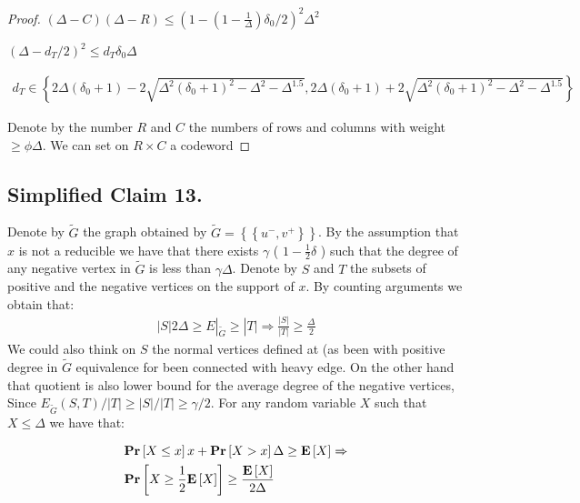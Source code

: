\begin{proof}
$\left( \Delta - C \right)\left( \Delta - R  \right) \le \left(1 - \left( 1 - \frac{1}{\Delta} \right)\delta_{0}/2  \right)^{2}\Delta^{2}$ 

$ \left( \Delta -d_{T}/2  \right)^{2} \le d_{T}\delta_{0}\Delta $


\begin{equation*}
  \begin{split}
    d_{T} \in  \left\{2 \Delta \left(\delta_{0} + 1\right) - 2 \sqrt{\Delta^{2} \left(\delta_{0} + 1\right)^{2} - \Delta^{2} - \Delta^{1.5}}, 2 \Delta \left(\delta_{0} + 1\right) + 2 \sqrt{\Delta^{2} \left(\delta_{0} + 1\right)^{2} - \Delta^{2} - \Delta^{1.5}}\right\}
  \end{split}
\end{equation*}


Denote by the number $R $ and $C$ the numbers of rows and columns with weight $\ge \phi \Delta$. We can set on $R\times C$ a codeword  
                        
                        
\end{proof}             

\subsection{Simplified Claim 13.} 
\newcommand{\Gtt}{\tilde{G}}
Denote by $\Gtt$ the graph obtained by $\Gtt  = \left\{ \left\{ u^{-}, v^{+} \right\}  \right\} $. By the assumption that $x$ is not a reducible we have that there exists $\gamma$ ( $ 1- \frac{1}{2}\delta$  )  such that the degree of any negative vertex in $\Gtt$ is less than $\gamma\Delta$. Denote by $S$ and $T$ the subsets of positive and the negative vertices on the support of $x$. By counting arguments we obtain that: 
\begin{equation*}
  \begin{split}
    |S| 2\Delta \ge E|_{\Gtt} \ge  |T| \Rightarrow \frac{|S|}{|T|} \ge \frac{\Delta}{2}
  \end{split}
\end{equation*}
We could also think on $S$ the normal vertices defined at \cite{leverrier2022quantum} (as been with positive degree in $\Gtt$ equivalence for been connected with heavy edge. On the other hand that quotient is also lower bound for the average degree of the negative vertices, Since $E_{\Gtt}(S,T)/|T| \ge |S|/|T| \ge \gamma/2$. For any random variable $X$ such that $X \le \Delta$ we have that: 

  \begin{equation*}
    \begin{split}
      & \mathbf{Pr} \left[ {X\le x} \right]x+\mathbf{Pr} \left[ {X > x} \right]\Delta\ge \mathbf{E} \left[ {X} \right]\Rightarrow \\ 
      & \mathbf{Pr} \left[ {X \ge \frac{1}{2} \mathbf{E} \left[ {X} \right] } \right] \ge \frac{\mathbf{E} \left[ {X} \right]}{2\Delta}
    \end{split}
  \end{equation*}

